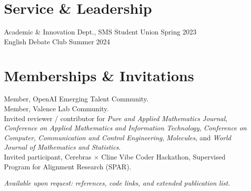 \documentclass[11pt]{article}
\newlength{\cvitemsep}     \setlength{\cvitemsep}{3pt}  %
\newlength{\projsep}      \setlength{\projsep}{\dimexpr 3\cvitemsep\relax} %
\begin{document}
\vspace{\projsep}

\section{Service \& Leadership}
Academic \& Innovation Dept., SMS Student Union \hfill Spring 2023 \\
English Debate Club \hfill Summer 2024

\vspace{\projsep}

\section{Memberships \& Invitations}
\noindent Member, OpenAI Emerging Talent Community. \\[\cvitemsep]
\noindent Member, Valence Lab Community. \\[\cvitemsep]
\noindent Invited reviewer / contributor for \textit{Pure and Applied Mathematics Journal}, \textit{Conference on Applied Mathematics and Information Technology}, \textit{Conference on Computer, Communication and Control Engineering}, \textit{Molecules},  and \textit{World Journal of Mathematics and Statistics}. \\[\cvitemsep]
\noindent Invited participant, Cerebras $\times$ Cline Vibe Coder Hackathon, Supervised Program for Alignment Research (SPAR).

\vspace{8pt}
\noindent\footnotesize \textit{Available upon request: references, code links, and extended publication list.}
\end{document}
